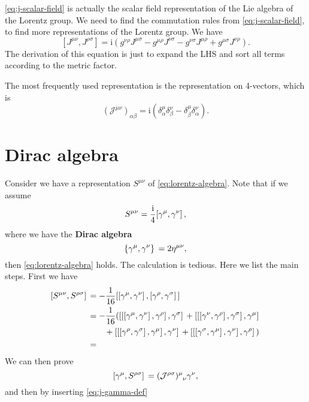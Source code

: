 \documentclass[hyperref, a4paper]{article}
\newcommand*{\ii}{\mathrm{i}}
\newcommand*{\concept}[1]{{\textbf{#1}}}
\begin{document}
\eqref{eq:j-scalar-field} is actually the scalar field representation of the Lie algebra of the Lorentz group.
We need to find the commutation rules from \eqref{eq:j-scalar-field}, to find more representations of the 
Lorentz group. We have 
\begin{equation}
    \left[J^{\mu \nu}, J^{\rho \sigma}\right]=\ii \left(g^{\nu \rho} J^{\mu \sigma}-g^{\mu \rho} J^{\nu \sigma}-g^{\nu \sigma} J^{\mu \rho}+g^{\mu \sigma} J^{\nu \rho}\right).
    \label{eq:lorentz-algebra}
\end{equation}
The derivation of this equation is just to expand the LHS and sort all terms according to the metric factor.

The most frequently used representation is the representation on 4-vectors, which is 
\begin{equation}
    (\mathcal{J}^{\mu \nu})_{\alpha \beta} = \ii (\delta^{\mu}_\alpha \delta^{\nu}_\beta - \delta^\mu_\beta \delta^\nu_\alpha).
    \label{eq:four-vec-lorentz}
\end{equation}

\section{Dirac algebra}

Consider we have a representation $S^{\mu \nu}$ of \eqref{eq:lorentz-algebra}. Note that if we assume 
\begin{equation}
    S^{\mu \nu} = \frac{\ii}{4} \comm*{\gamma^\mu}{\gamma^\nu},
    \label{eq:j-gamma-def}
\end{equation}
where we have the \concept{Dirac algebra}
\begin{equation}
    \acomm*{\gamma^\mu}{\gamma^\nu} = 2 \eta^{\mu \nu}, 
\end{equation}
then \eqref{eq:lorentz-algebra} holds. The calculation is tedious. Here we list the main steps. First we have 
\[
    \begin{aligned}
        \comm*{S^{\mu \nu}}{S^{\rho \sigma}} &= - \frac{1}{16} \comm*{\comm*{\gamma^\mu}{\gamma^\nu}}{\comm*{\gamma^\rho}{\gamma^\sigma}} \\
        &= - \frac{1}{16} (\comm*{\comm*{\comm*{\gamma^\mu}{\gamma^\nu}}{\gamma^\rho}}{\gamma^\sigma} 
        + \comm*{\comm*{\comm*{\gamma^\nu}{\gamma^\rho}}{\gamma^\sigma}}{\gamma^\mu} \\
        &\quad \quad + \comm*{\comm*{\comm*{\gamma^\rho}{\gamma^\sigma}}{\gamma^\mu}}{\gamma^\nu} 
        + \comm*{\comm*{\comm*{\gamma^\sigma}{\gamma^\mu}}{\gamma^\nu}}{\gamma^\rho}) \\
        &= 
    \end{aligned}
\]
We can then prove 
\begin{equation}
    \comm*{\gamma^\mu}{S^{\rho \sigma}} = (\mathcal{J}^{\rho \sigma}) \indices{^\mu_\nu} \gamma^\nu,
\end{equation}
and then by inserting \eqref{eq:j-gamma-def} 
\end{document}
